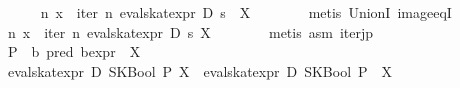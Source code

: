 \begin{isabellebody}
\ \ \ \ \isamarkupfalse%
\ {}{}n{}\ x\ {}\ {}{}iter\ n\ {}eval{}skat{}expr\ D\ s{}\ {}\ X{}{}\isanewline
\ \ \ \ \ \ \isamarkupfalse%
\ {}metis\ UnionI\ image{}eqI{}\isanewline
\ \ \ \ \isamarkupfalse%
\ {}{}n{}\ x\ {}\ iter\ n\ {}eval{}skat{}expr\ D\ s{}\ {}{}X{}{}\isanewline
\ \ \ \ \ \ \isamarkupfalse%
\ {}metis\ asm\ iter{}jp{}\isanewline
\ \ \isamarkupfalse%
\isanewline
{}\isamarkupfalse%
\isanewline
\ \ \isamarkupfalse%
\ P\ {}{}\ {}{}b\ pred\ bexpr{}\ \ X\isanewline
\ \ \isamarkupfalse%
\ {}eval{}skat{}expr\ D\ {}SKBool\ P{}\ {}{}X{}\ {}\ {}eval{}skat{}expr\ D\ {}SKBool\ P{}\ {}\ X{}\isanewline

\end{isabellebody}
